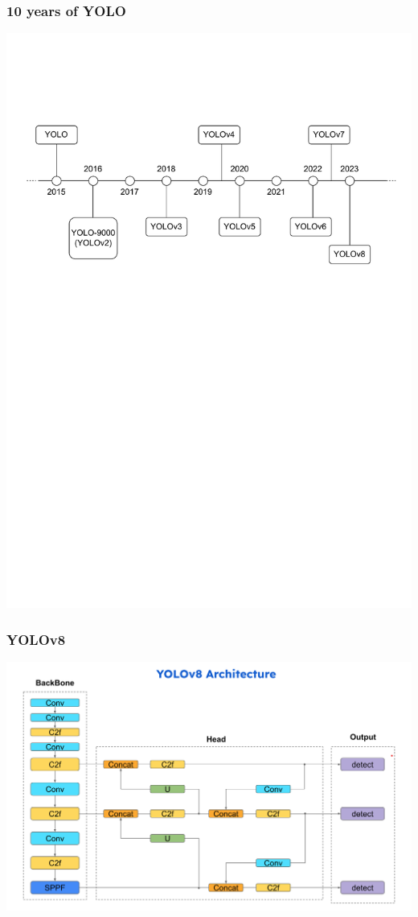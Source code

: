 \documentclass[serif]{beamer}  %
\begin{document}
\begin{frame}
\frametitle{10 years of YOLO}
\centering
\includegraphics[width=1\linewidth,keepaspectratio]{images/yolo_timeline.pdf}
\end{frame}

\begin{frame}
\frametitle{YOLOv8}
\centering
    \includegraphics[width=1\linewidth]{images/YOLO_architecture_simple.png}
\end{frame}
\end{document}
